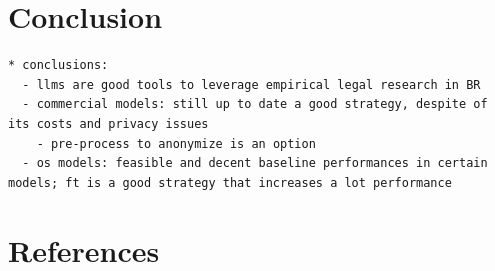\documentclass[
  12pt,
]{article}
\begin{document}
\section{Conclusion}\label{sec-conclusion}

\begin{verbatim}
* conclusions:
  - llms are good tools to leverage empirical legal research in BR
  - commercial models: still up to date a good strategy, despite of its costs and privacy issues
    - pre-process to anonymize is an option
  - os models: feasible and decent baseline performances in certain models; ft is a good strategy that increases a lot performance
\end{verbatim}

\newpage{}

\section{References}\label{sec-references}
\end{document}
